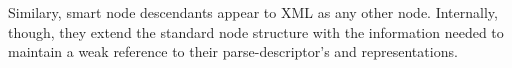 \documentclass{article}
\begin{document}
Similary, smart node descendants appear to XML as any other node.
Internally, though, they extend the standard node structure with the
information needed to maintain a weak reference to their
parse-descriptor's and representations.




\end{document}
